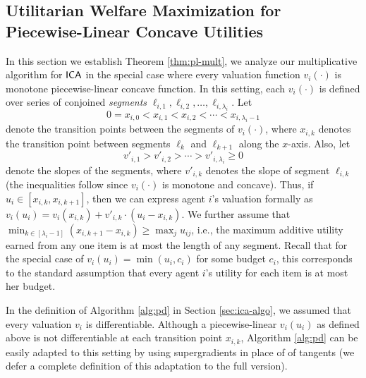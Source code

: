 \subsection{Utilitarian Welfare Maximization for Piecewise-Linear Concave Utilities}
\label{subsec:app-pl-welfare}





In this section we establish Theorem \ref{thm:pl-mult}, we analyze our multiplicative algorithm for $\mathsf{ICA}$ in the  special case where every valuation function $v_i(\cdot)$ is monotone piecewise-linear concave function. 
In this setting, each $v_i(\cdot)$ is defined over series of conjoined {\em segments} $\ell_{i,1}, \ell_{i,2}, \ldots, \ell_{i, \lambda_i}$. Let
\[
0 = x_{i,0} < x_{i,1} < x_{i,2} < \cdots < x_{i,\lambda_i -1}
\]
denote the transition points between the segments of $v_i(\cdot)$, where $x_{i,k}$ denotes the transition point between segments $\ell_{k}$ and $\ell_{k+1}$ along the $x$-axis. Also, let 
\[
v'_{i,1} > v'_{i,2} > \cdots > v'_{i,\lambda_i } \geq 0
\]
denote the slopes of the segments, where $v'_{i,k}$ denotes the slope of segment $\ell_{i,k}$ (the inequalities follow since $v_i(\cdot)$ is monotone and concave).
Thus, if $u_i \in [x_{i,k}, x_{i,k+1}]$, then we can express agent $i$'s valuation formally as $v_i(u_i) = v_i(x_{i,k}) + v'_{i,k}\cdot(u_i - x_{i,k})$.
We further assume that $\min_{k \in [\lambda_i-1]}\left(x_{i,k+1} - x_{i,k}\right) \geq \max_{j} u_{ij}$, i.e., the maximum additive utility earned from any one item is at most the length of any segment. Recall that for the special case of $v_i(u_i) = \min(u_i, c_i)$ for some budget $c_i$, this corresponds to the standard assumption that every agent $i$'s utility for each item is at most her budget.


In the definition of Algorithm \ref{alg:pd} in Section \ref{sec:ica-algo}, we assumed that every valuation $v_i$ is differentiable. Although a piecewise-linear $v_i(u_i)$ as defined above is not differentiable at each transition point $x_{i,k}$, Algorithm \ref{alg:pd} can be easily adapted to this setting by using supergradients in place of of tangents (we defer a complete definition of this adaptation to the full version).

